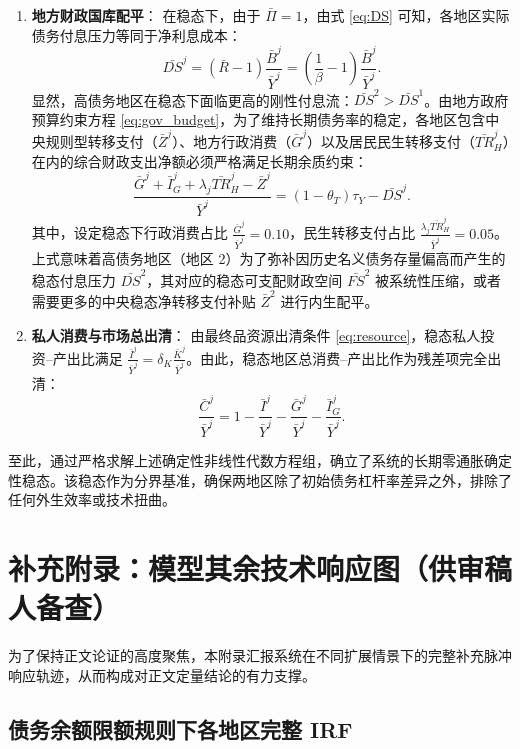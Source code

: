 \documentclass[12pt,UTF8]{ctexart}
\begin{document}
\begin{enumerate}
		\item \textbf{地方财政国库配平}：
		在稳态下，由于 $\bar{\Pi} = 1$，由式 \eqref{eq:DS} 可知，各地区实际债务付息压力等同于净利息成本：
		\begin{equation}
			\bar{DS}^j = (\bar{R} - 1)\frac{\bar{B}^j}{\bar{Y}^j} = \left(\frac{1}{\beta}-1\right)\frac{\bar{B}^j}{\bar{Y}^j}.
		\end{equation}
		显然，高债务地区在稳态下面临更高的刚性付息流：$\bar{DS}^2 > \bar{DS}^1$。由地方政府预算约束方程 \eqref{eq:gov_budget}，为了维持长期债务率的稳定，各地区包含中央规则型转移支付（$\bar{Z}^j$）、地方行政消费（$\bar{G}^j$）以及居民民生转移支付（$\bar{TR}_H^j$）在内的综合财政支出净额必须严格满足长期余质约束：
		\begin{equation}
			\frac{\bar{G}^j + \bar{I}_G^j + \lambda_j \bar{TR}_H^j - \bar{Z}^j}{\bar{Y}^j} = (1-\theta_T)\tau_Y - \bar{DS}^j.
		\end{equation}
		其中，设定稳态下行政消费占比 $\frac{\bar{G}^j}{\bar{Y}^j} = 0.10$，民生转移支付占比 $\frac{\lambda_j\bar{TR}_H^j}{\bar{Y}^j} = 0.05$。上式意味着高债务地区（地区 2）为了弥补因历史名义债务存量偏高而产生的稳态付息压力 $\bar{DS}^2$，其对应的稳态可支配财政空间 $\bar{FS}^2$ 被系统性压缩，或者需要更多的中央稳态净转移支付补贴 $\bar{Z}^2$ 进行内生配平。
		
		\item \textbf{私人消费与市场总出清}：
		由最终品资源出清条件 \eqref{eq:resource}，稳态私人投资--产出比满足 $\frac{\bar{I}^j}{\bar{Y}^j} = \delta_K \frac{\bar{K}^j}{\bar{Y}^j}$。由此，稳态地区总消费--产出比作为残差项完全出清：
		\begin{equation}
			\frac{\bar{C}^j}{\bar{Y}^j} = 1 - \frac{\bar{I}^j}{\bar{Y}^j} - \frac{\bar{G}^j}{\bar{Y}^j} - \frac{\bar{I}_G^j}{\bar{Y}^j}.
		\end{equation}
	\end{enumerate}
	至此，通过严格求解上述确定性非线性代数方程组，确立了系统的长期零通胀确定性稳态。该稳态作为分界基准，确保两地区除了初始债务杠杆率差异之外，排除了任何外生效率或技术扭曲。
	
	\section{补充附录：模型其余技术响应图（供审稿人备查）}
	
	为了保持正文论证的高度聚焦，本附录汇报系统在不同扩展情景下的完整补充脉冲响应轨迹，从而构成对正文定量结论的有力支撑。
	
	\subsection{债务余额限额规则下各地区完整 IRF}
	
\end{document}
